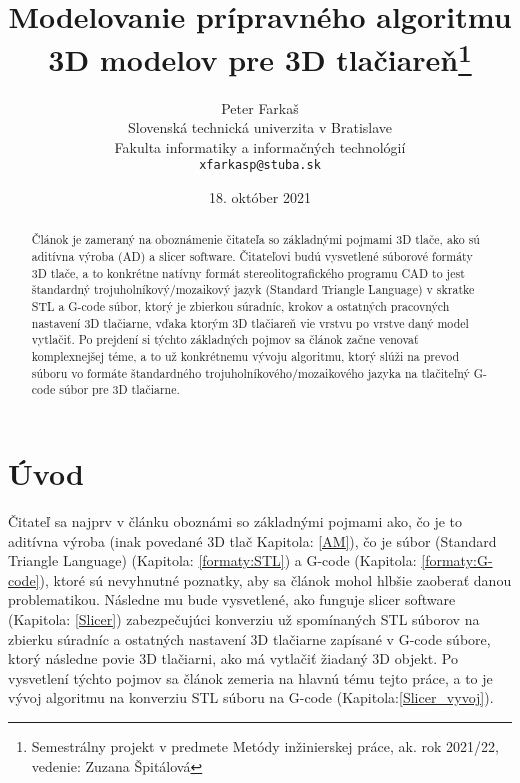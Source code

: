\documentclass[10pt,twoside,slovak,a4paper]{article}
\title{Modelovanie prípravného algoritmu 3D modelov pre 3D tlačiareň\thanks{Semestrálny projekt v predmete Metódy inžinierskej práce, ak. rok 2021/22, vedenie: Zuzana Špitálová}}
\author{Peter Farkaš\\[2pt]
	{\small Slovenská technická univerzita v Bratislave}\\
	{\small Fakulta informatiky a informačných technológií}\\
	{\small \texttt{xfarkasp@stuba.sk}}
	}
\date{\small 18. október 2021}
\begin{document}
\maketitle

\begin{abstract}
    Článok je zameraný na oboznámenie čitateľa so základnými pojmami 3D tlače, ako sú aditívna výroba (AD) a slicer software. Čitateľovi budú vysvetlené súborové formáty 3D tlače, a to konkrétne natívny formát stereolitografického programu CAD to jest štandardný trojuholníkový/mozaikový jazyk (Standard Triangle Language) v skratke STL a G-code súbor, ktorý je zbierkou súradníc, krokov a ostatných pracovných nastavení 3D tlačiarne, vďaka ktorým 3D tlačiareň vie vrstvu po vrstve daný model vytlačiť. Po prejdení si týchto základných pojmov sa článok začne venovať komplexnejšej téme, a to už konkrétnemu vývoju algoritmu, ktorý slúži na prevod súboru vo formáte štandardného trojuholníkového/mozaikového jazyka na tlačiteľný G-code súbor pre 3D tlačiarne. 
\end{abstract}

\section{Úvod}
    Čitateľ sa najprv v článku oboznámi so základnými pojmami ako, čo je to aditívna výroba (inak povedané 3D tlač Kapitola: \ref{AM}), čo je súbor  (Standard Triangle Language) (Kapitola: \ref{formaty:STL}) a G-code (Kapitola: \ref{formaty:G-code}), ktoré sú nevyhnutné poznatky, aby sa článok mohol hlbšie zaoberať danou problematikou. Následne mu bude vysvetlené, ako funguje slicer software (Kapitola: \ref{Slicer}) zabezpečujúci konverziu už spomínaných STL súborov na zbierku súradníc a ostatných nastavení 3D tlačiarne zapísané v G-code súbore, ktorý následne povie 3D tlačiarni, ako má vytlačiť žiadaný 3D objekt. Po vysvetlení týchto pojmov sa článok zemeria na hlavnú tému tejto práce, a to je vývoj algoritmu na konverziu STL súboru na G-code (Kapitola:\ref{Slicer_vyvoj}). 
\end{document}
